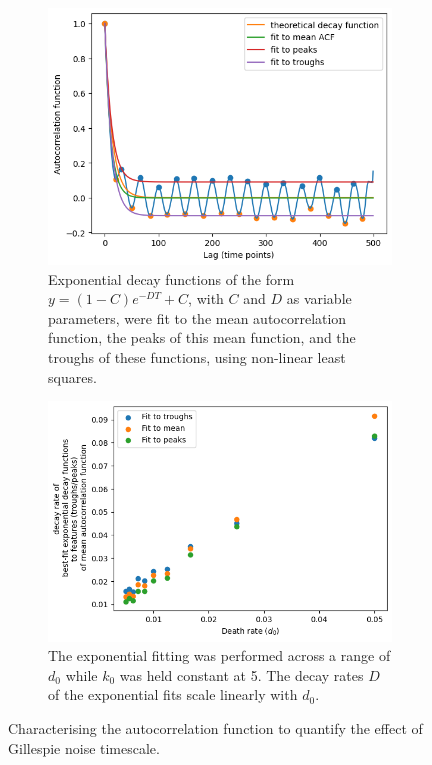 \begin{figure}
  \centering
  \begin{subfigure}[t]{0.45\textwidth}
  \centering
    \includegraphics[width=\linewidth]{acf_fit_example.png}
    \caption{
      Exponential decay functions of the form $y = (1-C)e^{-DT}+C$, with $C$ and $D$ as variable parameters, were fit to the mean autocorrelation function, the peaks of this mean function, and the troughs of these functions, using non-linear least squares.
    }
    \label{fig:acf-noisetimescale-effect-fit}
  \end{subfigure}%
  \begin{subfigure}[t]{0.45\textwidth}
  \centering
    \includegraphics[width=\linewidth]{deathrate_vs_decay.png}
    \caption{
      The exponential fitting was performed across a range of $d_{0}$ while $k_{0}$ was held constant at 5.
      The decay rates $D$ of the exponential fits scale linearly with $d_{0}$.
    }
    \label{fig:acf-noisetimescale-effect-relationship}
  \end{subfigure}

  \caption{
    Characterising the autocorrelation function to quantify the effect of Gillespie noise timescale.
  }
  \label{fig:acf-noisetimescale-effect}
\end{figure}

